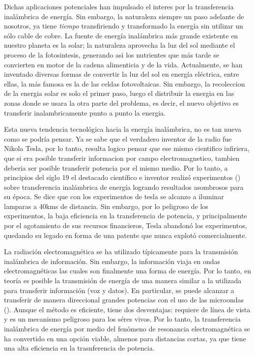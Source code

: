 \documentclass{intech}
\begin{document}
Dichas aplicaciones potenciales han impulsado el interes por
la transferencia inal\'ambrica de energ{\'i}a. Sin embargo, la naturaleza siempre un paso adelante de nosotros, ya tiene {\it tiempo} transfiriendo y transformado la energ{\'i}a sin utilizar un s\'olo cable de cobre. La fuente de energ\'{i}a inal\'ambrica
m\'as grande existente en nuestro planeta es la solar; la naturaleza aprovecha la luz del sol mediante el proceso de la fotosintesis,
generando asi los nutrientes que m\'as tarde se convierten en motor de la cadena alimenticia y de la vida.  
Actualmente, se han inventado diversas formas de convertir la luz del sol en energ{\'i}a el\'ectrica, entre ellas, la m\'as famosa es la de las celdas fotovoltaicas. Sin embargo, la recoleccion de la energia solar
es solo el primer paso, luego el distribuir la energia en las zonas donde se usara la otra parte
del problema, es decir,  el nuevo objetivo es transferir inalambricamente punto a punto la energia.


Esta nueva tendencia tecnol\'ogica hacia la energ{\'i}a inal\'ambrica, no es tan nueva
como se podr{\'i}a pensar. Ya se sabe que el verdadero inventor de la radio fue Nikola Tesla, por lo tanto, resulta logico
pensar que ese mismo cientifico infiriera, que si era posible  transferir informacion por campo electromagnetico, tambien
deberia ser posible transferir potencia por el mismo medio.  Por lo tanto, a principios del siglo 19 el destacado cient{\'i}fico e inventor realiz\'o experimentos (\cite{RES20}) sobre transferencia inal\'ambrica de energ{\'i}a logrando resultados asombrosos para su \'epoca.
Se dice que con los experimentos de tesla se alcanzo a  iluminar lamparas a 40kms de distancia.
Sin embargo, por lo peligroso de los experimentos, la baja eficiencia en la transferencia de potencia, y principalmente por el agotamiento de sus recursos financieros, Tesla abandon\'o los experimentos, quedando su legado en forma de una patente que nunca explot\'o comercialmente. 


La radiaci\'on electromagn\'etica  se ha utilizado t{\'i}picamente para la transmisi\'on inal\'ambrica de informaci\'on.
 Sin embargo, la informaci\'on viaja en ondas electromagn\'eticas las cuales son finalmente una forma de energ{\'i}a. Por lo tanto,
 en teor{\'i}a es posible la transmisi\'on de energ{\'i}a de una manera similar
 a la utilizada para transferir informaci\'on (voz y datos). En particular, se puede alcanzar a transferir de manera direccional grandes potencias con el uso de las microondas (\cite{RES22}). Aunque el m\'etodo es eficiente, tiene dos desventajas: requiere de l{\'i}nea de vista y es un mecanismo peligroso para los s\'eres vivos. Por lo tanto, la  transferencia inal\'ambrica de energ{\'i}a  por medio del fen\'omeno de resonancia electromagn\'etica
se ha convertido en una opci\'on viable, almenos para distancias cortas, ya que tiene una alta eficiencia
en la trasnferencia de potencia.
\end{document}

